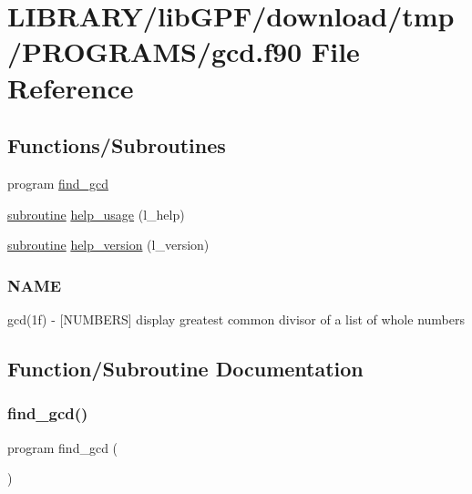 \hypertarget{gcd_8f90}{}\section{L\+I\+B\+R\+A\+R\+Y/lib\+G\+P\+F/download/tmp/\+P\+R\+O\+G\+R\+A\+M\+S/gcd.f90 File Reference}
\label{gcd_8f90}
\subsection*{Functions/\+Subroutines}
\begin{DoxyCompactItemize}
\item 
program \hyperlink{gcd_8f90_a38924afeefabd20962a8d2f87c2949d7}{find\+\_\+gcd}
\item 
\hyperlink{M__stopwatch_83_8txt_acfbcff50169d691ff02d4a123ed70482}{subroutine} \hyperlink{gcd_8f90_a3e09a3b52ee8fb04eeb93fe5761626a8}{help\+\_\+usage} (l\+\_\+help)
\item 
\hyperlink{M__stopwatch_83_8txt_acfbcff50169d691ff02d4a123ed70482}{subroutine} \hyperlink{gcd_8f90_a39c21619b08a3c22f19e2306efd7f766}{help\+\_\+version} (l\+\_\+version)
\begin{DoxyCompactList}\small\item\em \subsubsection*{N\+A\+ME}

gcd(1f) -\/ \mbox{[}N\+U\+M\+B\+E\+RS\mbox{]} display greatest common divisor of a list of whole numbers \end{DoxyCompactList}\end{DoxyCompactItemize}


\subsection{Function/\+Subroutine Documentation}
\mbox{\label{gcd_8f90_a38924afeefabd20962a8d2f87c2949d7}} 
\subsubsection{\texorpdfstring{find\+\_\+gcd()}{find\_gcd()}}
{\footnotesize\ttfamily program find\+\_\+gcd (\begin{DoxyParamCaption}{ }\end{DoxyParamCaption})}



